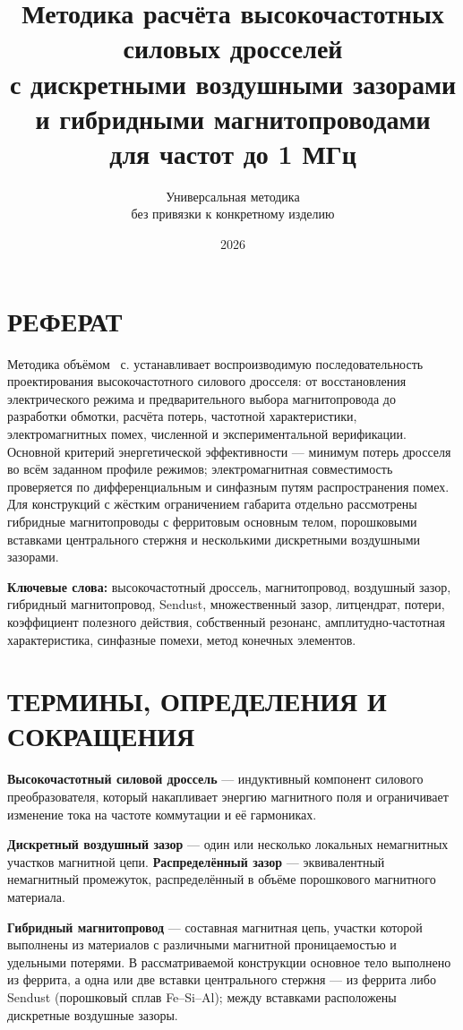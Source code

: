 \documentclass[14pt,a4paper]{extarticle}
\title{Методика расчёта высокочастотных силовых дросселей\\
с дискретными воздушными зазорами и гибридными магнитопроводами\\
для частот до 1 МГц}
\author{Универсальная методика\\без привязки к конкретному изделию}
\date{2026}
\begin{document}
\maketitle
\thispagestyle{empty}
\newpage

\section*{РЕФЕРАТ}

Методика объёмом \pageref{LastPage}~с. устанавливает
воспроизводимую последовательность проектирования высокочастотного силового
дросселя: от восстановления электрического режима и предварительного выбора
магнитопровода до разработки обмотки, расчёта потерь, частотной характеристики,
электромагнитных помех, численной и экспериментальной верификации. Основной
критерий энергетической эффективности --- минимум потерь дросселя во всём
заданном профиле режимов; электромагнитная совместимость проверяется по
дифференциальным и синфазным путям распространения помех. Для конструкций с
жёстким ограничением габарита отдельно рассмотрены гибридные магнитопроводы с
ферритовым основным телом, порошковыми вставками центрального стержня и
несколькими дискретными воздушными зазорами.

\noindent\textbf{Ключевые слова:} высокочастотный дроссель, магнитопровод,
воздушный зазор, гибридный магнитопровод, Sendust, множественный зазор,
литцендрат, потери, коэффициент полезного действия, собственный резонанс,
амплитудно-частотная характеристика, синфазные помехи, метод конечных элементов.

\newpage
\tableofcontents
\newpage

\section*{ТЕРМИНЫ, ОПРЕДЕЛЕНИЯ И СОКРАЩЕНИЯ}

\textbf{Высокочастотный силовой дроссель} --- индуктивный компонент силового
преобразователя, который накапливает энергию магнитного поля и ограничивает
изменение тока на частоте коммутации и её гармониках.

\textbf{Дискретный воздушный зазор} --- один или несколько локальных
немагнитных участков магнитной цепи. \textbf{Распределённый зазор} ---
эквивалентный немагнитный промежуток, распределённый в объёме порошкового
магнитного материала.

\textbf{Гибридный магнитопровод} --- составная магнитная цепь, участки которой
выполнены из материалов с различными магнитной проницаемостью и удельными
потерями. В рассматриваемой конструкции основное тело выполнено из феррита, а
одна или две вставки центрального стержня --- из феррита либо Sendust
(порошковый сплав Fe--Si--Al); между вставками расположены дискретные воздушные
зазоры.
\end{document}
